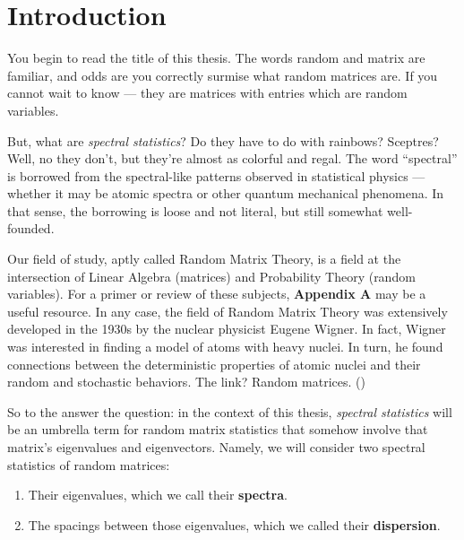 
  \chapter*{Introduction}


You begin to read the title of this thesis. The words random and matrix are familiar, and odds are you correctly surmise what random matrices are.
If you cannot wait to know --- they are matrices with entries which are random variables.

But, what are \textit{spectral statistics}? Do they have to do with rainbows? Sceptres? Well, no they don’t, but they’re almost as colorful and regal.
The word ``spectral'' is borrowed from the spectral-like patterns observed in statistical physics --- whether it may be atomic spectra or other quantum mechanical phenomena.
In that sense, the borrowing is loose and not literal, but still somewhat well-founded.

Our field of study, aptly called Random Matrix Theory, is a field at the intersection of Linear Algebra (matrices) and Probability Theory (random variables).
For a primer or review of these subjects, \textbf{Appendix A} may be a useful resource.
In any case, the field of Random Matrix Theory was extensively developed in the 1930s by the nuclear physicist Eugene Wigner. In fact, Wigner was interested in finding a model of atoms with heavy nuclei.
In turn, he found connections between the deterministic properties of atomic nuclei and their random and stochastic behaviors.
The link? Random matrices. (\cite{wigneratom})

So to the answer the question: in the context of this thesis, \textit{spectral statistics} will be an umbrella term for random matrix statistics that somehow involve that matrix's eigenvalues and eigenvectors.
Namely, we will consider two spectral statistics of random matrices:
  \begin{enumerate}
    \item Their eigenvalues, which we call their \textbf{spectra}.
    \item The spacings between those eigenvalues, which we called their \textbf{dispersion}.
  \end{enumerate}

